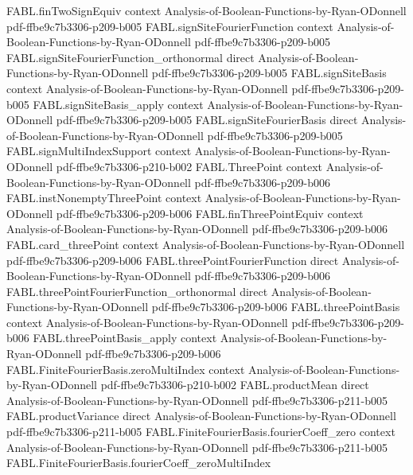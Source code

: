 \begin{theorem}
\proofstep
  {FABL.finTwoSignEquiv}
  {context}
  {Analysis-of-Boolean-Functions-by-Ryan-ODonnell}
  {pdf-ffbe9c7b3306-p209-b005}
\proofstep
  {FABL.signSiteFourierFunction}
  {context}
  {Analysis-of-Boolean-Functions-by-Ryan-ODonnell}
  {pdf-ffbe9c7b3306-p209-b005}
\proofstep
  {FABL.signSiteFourierFunction_orthonormal}
  {direct}
  {Analysis-of-Boolean-Functions-by-Ryan-ODonnell}
  {pdf-ffbe9c7b3306-p209-b005}
\proofstep
  {FABL.signSiteBasis}
  {context}
  {Analysis-of-Boolean-Functions-by-Ryan-ODonnell}
  {pdf-ffbe9c7b3306-p209-b005}
\proofstep
  {FABL.signSiteBasis_apply}
  {context}
  {Analysis-of-Boolean-Functions-by-Ryan-ODonnell}
  {pdf-ffbe9c7b3306-p209-b005}
\proofstep
  {FABL.signSiteFourierBasis}
  {direct}
  {Analysis-of-Boolean-Functions-by-Ryan-ODonnell}
  {pdf-ffbe9c7b3306-p209-b005}
\proofstep
  {FABL.signMultiIndexSupport}
  {context}
  {Analysis-of-Boolean-Functions-by-Ryan-ODonnell}
  {pdf-ffbe9c7b3306-p210-b002}
\proofstep
  {FABL.ThreePoint}
  {context}
  {Analysis-of-Boolean-Functions-by-Ryan-ODonnell}
  {pdf-ffbe9c7b3306-p209-b006}
\proofstep
  {FABL.instNonemptyThreePoint}
  {context}
  {Analysis-of-Boolean-Functions-by-Ryan-ODonnell}
  {pdf-ffbe9c7b3306-p209-b006}
\proofstep
  {FABL.finThreePointEquiv}
  {context}
  {Analysis-of-Boolean-Functions-by-Ryan-ODonnell}
  {pdf-ffbe9c7b3306-p209-b006}
\proofstep
  {FABL.card_threePoint}
  {context}
  {Analysis-of-Boolean-Functions-by-Ryan-ODonnell}
  {pdf-ffbe9c7b3306-p209-b006}
\proofstep
  {FABL.threePointFourierFunction}
  {direct}
  {Analysis-of-Boolean-Functions-by-Ryan-ODonnell}
  {pdf-ffbe9c7b3306-p209-b006}
\proofstep
  {FABL.threePointFourierFunction_orthonormal}
  {direct}
  {Analysis-of-Boolean-Functions-by-Ryan-ODonnell}
  {pdf-ffbe9c7b3306-p209-b006}
\proofstep
  {FABL.threePointBasis}
  {context}
  {Analysis-of-Boolean-Functions-by-Ryan-ODonnell}
  {pdf-ffbe9c7b3306-p209-b006}
\proofstep
  {FABL.threePointBasis_apply}
  {context}
  {Analysis-of-Boolean-Functions-by-Ryan-ODonnell}
  {pdf-ffbe9c7b3306-p209-b006}
\proofstep
  {FABL.FiniteFourierBasis.zeroMultiIndex}
  {context}
  {Analysis-of-Boolean-Functions-by-Ryan-ODonnell}
  {pdf-ffbe9c7b3306-p210-b002}
\proofstep
  {FABL.productMean}
  {direct}
  {Analysis-of-Boolean-Functions-by-Ryan-ODonnell}
  {pdf-ffbe9c7b3306-p211-b005}
\proofstep
  {FABL.productVariance}
  {direct}
  {Analysis-of-Boolean-Functions-by-Ryan-ODonnell}
  {pdf-ffbe9c7b3306-p211-b005}
\proofstep
  {FABL.FiniteFourierBasis.fourierCoeff_zero}
  {context}
  {Analysis-of-Boolean-Functions-by-Ryan-ODonnell}
  {pdf-ffbe9c7b3306-p211-b005}
\proofstep
  {FABL.FiniteFourierBasis.fourierCoeff_zeroMultiIndex}

\end{theorem}
